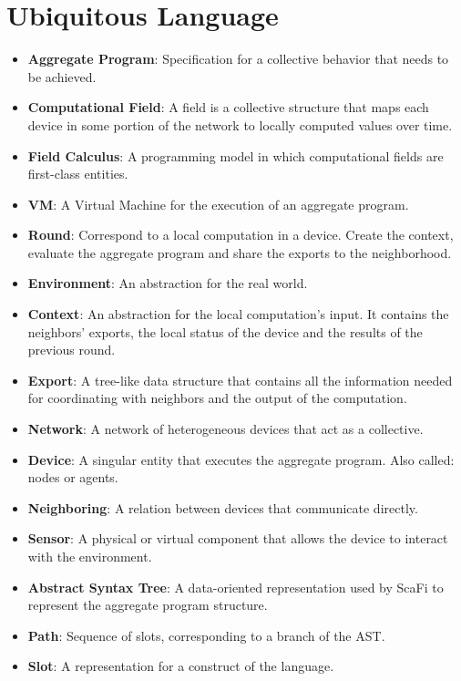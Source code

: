 \section{Ubiquitous Language}

\begin{itemize}
    \item \textbf{Aggregate Program}: Specification for a collective behavior that needs to be achieved.
    \item \textbf{Computational Field}: A field is a collective structure that maps each device in some portion of the network to locally computed values over time.
    \item \textbf{Field Calculus}: A programming model in which computational fields are first-class entities.
    \item \textbf{VM}: A Virtual Machine for the execution of an aggregate program.
    \item \textbf{Round}: Correspond to a local computation in a device. Create the context, evaluate the aggregate program and share the exports to the neighborhood.
    \item \textbf{Environment}: An abstraction for the real world.
    \item \textbf{Context}: An abstraction for the local computation's input. It contains the neighbors' exports, the local status of the device and the results of the previous round.
    \item \textbf{Export}: A tree-like data structure that contains all the information needed for coordinating with neighbors and the output of the computation.
    \item \textbf{Network}: A network of heterogeneous devices that act as a collective.
    \item \textbf{Device}: A singular entity that executes the aggregate program. Also called: nodes or agents.
    \item \textbf{Neighboring}: A relation between devices that communicate directly.
    \item \textbf{Sensor}: A physical or virtual component that allows the device to interact with the environment.
    \item \textbf{Abstract Syntax Tree}: A data-oriented representation used by ScaFi to represent the aggregate program structure.
    \item \textbf{Path}: Sequence of slots, corresponding to a branch of the AST.
    \item \textbf{Slot}: A representation for a construct of the language.

\end{itemize}
